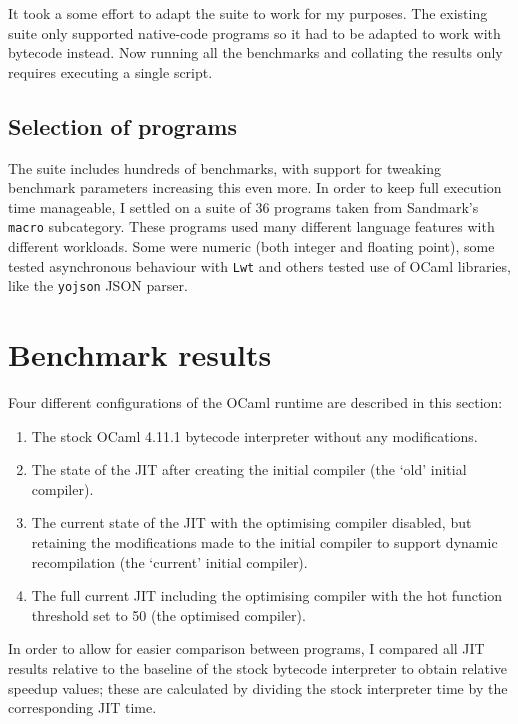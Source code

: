 It took a some effort to adapt the suite to work for my purposes. The existing suite only
supported native-code programs so it had to be adapted to work with bytecode instead. Now running
all the benchmarks and collating the results only requires executing a single script.

\subsection{Selection of programs}

The suite includes hundreds of benchmarks, with support for tweaking benchmark parameters
increasing
this even more. In order to keep full execution time manageable, I settled on a suite of 36
programs taken from Sandmark's \texttt{macro} subcategory. These programs used many different
language features with different workloads. Some were numeric (both integer and floating point),
some tested asynchronous behaviour with \texttt{Lwt} and others tested use of OCaml libraries, like
the \texttt{yojson} JSON parser.

\section{Benchmark results}

Four different configurations of the OCaml runtime are described in this section:

\begin{enumerate}
    \item The stock OCaml 4.11.1 bytecode interpreter without any modifications.
    \item The state of the JIT after creating the initial compiler (the `old' initial compiler).
    \item The current state of the JIT with the optimising compiler disabled, but retaining
          the modifications made to the initial compiler to support dynamic recompilation (the
          `current' initial compiler).
    \item The full current JIT including the optimising compiler with the hot function threshold
          set to 50 (the optimised compiler).
\end{enumerate}

In order to allow for easier comparison between programs, I compared all JIT results relative
to the baseline of the stock bytecode interpreter to obtain relative speedup values; these are
calculated by dividing the stock interpreter time by the corresponding JIT time.

